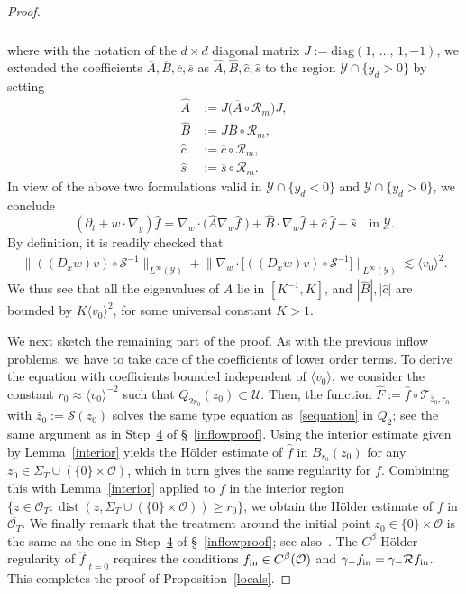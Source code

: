 \documentclass[10pt]{amsart}
\theoremstyle{definition}\newtheorem{defi}[theo]{Definition}\newtheorem{rema}[theo]{Remark}\newtheorem{exam}[theo]{Example}\newtheorem{exem}[theo]{Example}\newtheorem{nota}[theo]{Notation}
\DeclareMathOperator{\dist}{dist}
\newcommand*\p{\partial}
\newcommand*\diag{\mathrm{diag}}
\newcommand*\fin {f_{\rm in}}
\newcommand*\Rm {\mathcal{R}_m}
\newcommand*\T{\mathcal{T}}
\renewcommand*\SS {\mathcal{S}}
\newcommand*\RR {\mathcal{R}}
\newcommand*\U {\mathcal{U}}
\newcommand*\Y {\mathcal{Y}}
\newcommand*\OO {\mathcal{O}}
\newcommand{\lvv}{\langle v_0\rangle}
\begin{document}
\begin{proof}
\begin{multline*}
\begin{aligned}
\end{aligned}
\end{multline*}
where with the notation of the $d\times d$ diagonal matrix $J:=\diag(1,\,\ldots,\,1,-1)$, we extended the coefficients $\overline{A},\overline{B},\overline{c},\overline{s}$ as $\widehat{A},\widehat{B},\widehat{c},\widehat{s}$ to the region $\Y\cap\{y_d> 0\}$ by setting
\begin{align*}
\widehat{A}&:=J\big(\overline{A}\circ\Rm\big) J,\\
\widehat{B}&:=J\overline{B}\circ\Rm,\\
\widehat{c}&:=\overline{c}\circ\Rm,\\
\widehat{s}&:=\overline{s}\circ\Rm.
\end{align*}
In view of the above two formulations valid in $\Y\cap\{y_d<0\}$ and $\Y\cap\{y_d>0\}$, we conclude
\begin{equation}\label{sequation}
\left(\p_t+w\cdot\nabla_y\right)\widehat{f} =\nabla_w\cdot\big(\widehat{A}\nabla_w\widehat{f}\;\!\big) +\widehat{B}\cdot\nabla_w\widehat{f}+ \widehat{c}\,\widehat{f}+\widehat{s} \quad\text{in}\;\Y.
\end{equation}
By definition, it is readily checked that
\begin{align*}
\big\|((D_xw)v)\circ\SS^{-1}\big\|_{L^\infty(\Y)} +\big\|\nabla_w\cdot\big[((D_xw)v)\circ\SS^{-1}\big]\big\|_{L^\infty(\Y)}
\lesssim \lvv^2.
\end{align*}
We thus see that all the eigenvalues of $\widehat{A}$ lie in $[K^{-1},K]$, and $|\widehat{B}|, |\widehat{c}|$ are bounded by $K\lvv^2$, for some universal constant $K>1$.

We next sketch the remaining part of the proof. As with the previous inflow problems, we have to take care of the coefficients of lower order terms. To derive the equation with coefficients bounded independent of $\lvv$, we consider the constant $r_0\approx\lvv^{-2}$ such that $Q_{2r_0}(z_0)\subset\U$. Then, the function $\widehat{F}:=\widehat{f}\circ\T_{\overline{z}_0,r_0}$ with $\overline{z}_0:=\SS(z_0)$ solves the same type equation as~\eqref{sequation} in $Q_2$; see the same argument as in Step~\hyperref[step4]{4} of \S~\ref{inflowproof}. Using the interior estimate given by Lemma~\ref{interior} yields the H\"older estimate of $\widehat{f}$ in $B_{r_0}(z_0)$ for any $z_0\in\Sigma_T\cup(\{0\}\times\OO)$, which in turn gives the same regularity for $f$. Combining this with Lemma~\ref{interior} applied to $f$ in the interior region $\{z\in\OO_T: \dist(z,\Sigma_T\cup(\{0\}\times\OO))\ge r_0\}$, we obtain the H\"older estimate of $f$ in $\overline{\OO_T}$. We finally remark that the treatment around the initial point $z_0\in\{0\}\times\OO$ is the same as the one in Step~\hyperref[step4]{4} of \S~\ref{inflowproof}; see also~\cite[Corollary~4.6]{YZ}. The $C^\beta$-H\"older regularity of $\widehat{f}|_{t=0}$ requires the conditions $\fin\in C^\beta(\OO)$ and $\gamma_-\fin=\gamma_-\RR\fin$. This completes the proof of Proposition~\ref{locals}.
\end{proof}
\end{document}
